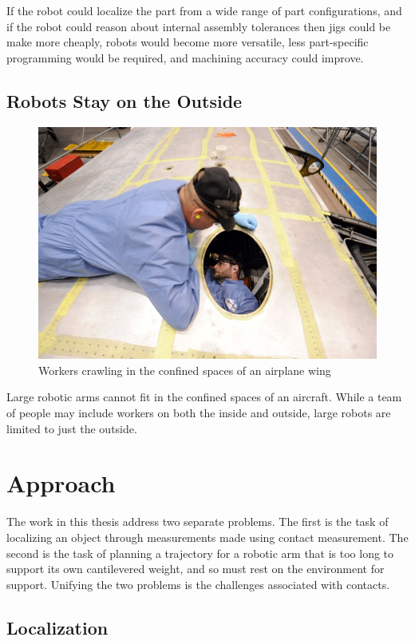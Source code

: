 \documentclass[../thesis.tex]{subfiles}
\begin{document}
If the robot could localize the part from a wide range of part configurations, and if the robot could reason about internal assembly tolerances then jigs could be make more cheaply, robots would become more versatile, less part-specific programming would be required, and machining accuracy could improve.

\subsection{Robots Stay on the Outside}

\begin{figure}
  \centering
  \label{fig:PeopleInWing}
  \includegraphics[width=.7\linewidth]{./Introduction/PeopleInWing.jpg}  
  \caption{Workers crawling in the confined spaces of an airplane wing}
\end{figure}

Large robotic arms cannot fit in the confined spaces of an aircraft.
While a team of people may include workers on both the inside and outside, large robots are limited to just the outside.



\section{Approach}
The work in this thesis address two separate problems. The first is the task of localizing an object through measurements made using contact measurement.
The second is the task of planning a trajectory for a robotic arm that is too long to support its own cantilevered weight, and so must rest on the environment for support.
Unifying the two problems is the challenges associated with contacts.

\subsection{Localization}
\end{document}
